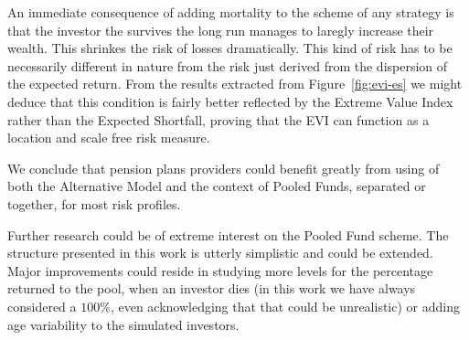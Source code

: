 An immediate consequence of adding mortality to the scheme of any strategy is that the investor the survives the long run manages to laregly increase their wealth. This shrinkes the risk of losses dramatically. This kind of risk has to be necessarily different in nature from the risk just derived from the dispersion of the expected return. From the results extracted from Figure~\ref{fig:evi-es} we might deduce that this condition is fairly better reflected by the Extreme Value Index rather than the Expected Shortfall, proving that the EVI can function as a location and scale free risk measure.

We conclude that pension plans providers could benefit greatly from using of both the Alternative Model and the context of Pooled Funds, separated or together, for most risk profiles.

Further research could be of extreme interest on the Pooled Fund scheme. The structure presented in this work is utterly simplistic and could be extended. Major improvements could reside in studying more levels for the percentage returned to the pool, when an investor dies (in this work we have always considered a $100\%$, even acknowledging that that could be unrealistic) or adding age variability to the simulated investors.
